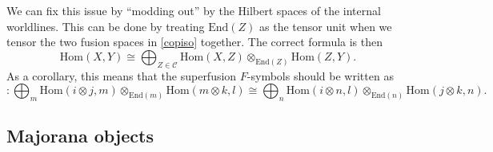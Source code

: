 \documentclass[12pt,a4paper]{article}
\newcommand{\tp}{\otimes}
\newcommand{\cc}{\mathbb{C}}
\newcommand\be            {\begin{equation}}
\newcommand\ee            {\end{equation}}
\newcommand{\mcc}{\mathcal{C}}
\newcommand{\Hom}{\text{Hom}}
\newcommand{\End}{\text{End}}
\begin{document}
We can fix this issue by ``modding out'' by the Hilbert spaces of the internal worldlines. 
This can be done by treating $\End(Z)$ as the tensor unit when we tensor the two fusion spaces in \eqref{copiso} together. The correct formula is then
\be  \Hom(X,Y) \cong \bigoplus_{Z\in \mcc} \Hom(X,Z) \tp_{\End(Z)} \Hom(Z,Y).\ee
As a corollary, this means that the superfusion $F$-symbols should be written as 
\be [F^{ijk}_l] : \bigoplus_m \Hom(i\tp j,m) \tp_{\End(m)} \Hom(m\tp k,l) \cong \bigoplus_n \Hom(i\tp n,l) \tp_{\End(n)} \Hom(j\tp k,n).\ee


 
\subsection{Majorana objects}
\end{document}
